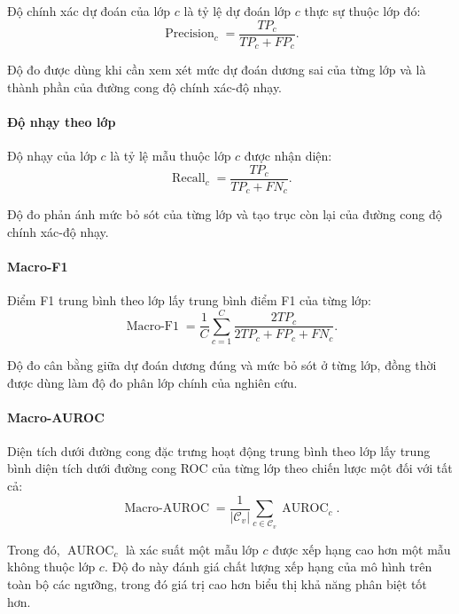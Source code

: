 Độ chính xác dự đoán của lớp $c$ là tỷ lệ dự đoán lớp $c$ thực sự thuộc lớp đó:
\begin{equation}
\operatorname{Precision}_c=\frac{TP_c}{TP_c+FP_c}.
\label{eq:ch4_precision_def}
\end{equation}

Độ đo được dùng khi cần xem xét mức dự đoán dương sai của từng lớp và là thành phần của đường cong độ chính xác-độ nhạy.

\paragraph{Độ nhạy theo lớp}

Độ nhạy của lớp $c$ là tỷ lệ mẫu thuộc lớp $c$ được nhận diện:
\begin{equation}
\operatorname{Recall}_c=\frac{TP_c}{TP_c+FN_c}.
\label{eq:ch4_recall_def}
\end{equation}

Độ đo phản ánh mức bỏ sót của từng lớp và tạo trục còn lại của đường cong độ chính xác-độ nhạy.

\paragraph{Macro-F1}

Điểm F1 trung bình theo lớp lấy trung bình điểm F1 của từng lớp:
\begin{equation}
\operatorname{Macro\text{-}F1}
=\frac{1}{C}\sum_{c=1}^{C}\frac{2TP_c}{2TP_c+FP_c+FN_c}.
\label{eq:ch4_macro_f1}
\end{equation}

Độ đo cân bằng giữa dự đoán dương đúng và mức bỏ sót ở từng lớp, đồng thời được dùng làm độ đo phân lớp chính của nghiên cứu.

\paragraph{Macro-AUROC}

Diện tích dưới đường cong đặc trưng hoạt động trung bình theo lớp \cite{Fawcett2006ROC} lấy trung bình diện tích dưới đường cong ROC của từng lớp theo chiến lược một đối với tất cả:
\begin{equation}
\operatorname{Macro\text{-}AUROC}
=\frac{1}{|\mathcal{C}_v|}\sum_{c\in\mathcal{C}_v}\operatorname{AUROC}_c.
\label{eq:ch4_macro_auroc}
\end{equation}

Trong đó, $\operatorname{AUROC}_c$ là xác suất một mẫu lớp $c$ được xếp hạng cao hơn một mẫu không thuộc lớp $c$. Độ đo này đánh giá chất lượng xếp hạng của mô hình trên toàn bộ các ngưỡng, trong đó giá trị cao hơn biểu thị khả năng phân biệt tốt hơn.

